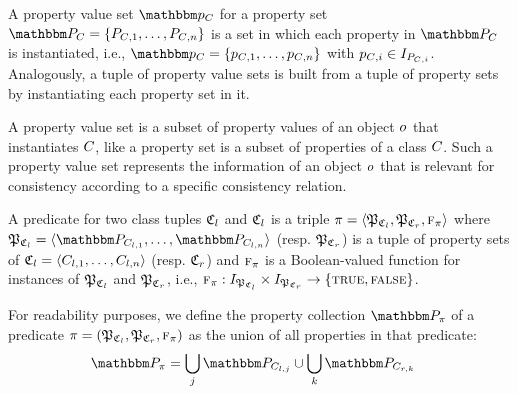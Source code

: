 \begin{definition}
A property value set $\propertyvalueset{p}{\class{C}{}}$ for a property set $\propertyset{P}{\class{C}{}} = \setted{P_{\class{C}{}, 1}, \dots, P_{\class{C}{}, n}}$ is a set in which each property in $\propertyset{P}{\class{C}{}}$ is instantiated, i.e., $\propertyvalueset{p}{\class{C}{}} = \setted{p_{\class{C}{}, 1}, \dots, p_{\class{C}{}, n}}$ with $p_{\class{C}{}, i} \in I_{P_{\class{C}{}, i}}$. 
Analogously, a tuple of property value sets is built from a tuple of property sets by instantiating each property set in it.
\end{definition}

A property value set is a subset of property values of an object $\object{o}{}$ that instantiates $\class{C}{}$, like a property set is a subset of properties of a class $\class{C}{}$. Such a property value set represents the information of an object $\object{o}{}$ that is relevant for consistency according to a specific consistency relation.

\begin{definition}[Predicate]
A predicate for two class tuples $\classtuple{C}{l}$ and $\classtuple{C}{l}$ is a triple $\pi = \tupled{\propertysettuple{P}{\classtuple{C}{l}}, \propertysettuple{P}{\classtuple{C}{r}}, \function{f}_\pi}$ where $\propertysettuple{P}{\classtuple{C}{l}} = \tupled{\propertyset{P}{\class{C}{l,1}}, \dots, \propertyset{P}{\class{C}{l,n}}}$ (resp. $\propertysettuple{P}{\classtuple{C}{r}}$) is a tuple of property sets of $\classtuple{C}{l} = \tupled{\class{C}{l,1}, \dots, \class{C}{l,n}}$ (resp. $\classtuple{C}{r}$) and $\textsc{f}_\pi$ is a Boolean-valued function for instances of $\tuple{P}_{\classtuple{C}{l}}$ and $\tuple{P}_{\classtuple{C}{r}}$, i.e., $\function{f}_\pi : \instances{\propertysettuple{P}{\classtuple{C}{l}}} \times \instances{\propertysettuple{P}{\classtuple{C}{r}}} \to \setted{\textsc{true}, \textsc{false}}$.
\end{definition}

For readability purposes, we define the property collection $\propertycollection{\pi}$ of a predicate $\pi = (\propertysettuple{P}{\classtuple{C}{l}}, \propertysettuple{P}{\classtuple{C}{r}}, \function{f}_\pi)$ as the union of all properties in that predicate:
\begin{align*}
    &
    \propertycollection{\pi} = \bigcup_{j} \propertyset{P}{\class{C}{l,j}} \cup \bigcup_{k} \propertyset{P}{\class{C}{r,k}}
\end{align*}

